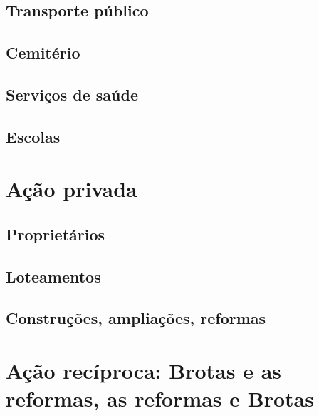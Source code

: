 \documentclass[
	12pt,					%
	openright,			%
	twoside,			%
	a4paper,			%
	english,				%
	french,				%
	spanish,			%
	brazil				%
	]{abntex2}
\begin{document}
\lipsum[50]

\subsection{Transporte público}\label{subsec:3.1.4}

\lipsum[50]

\subsection{Cemitério}\label{subsec:3.1.5}

\lipsum[50]

\subsection{Serviços de saúde}\label{subsec:3.1.6}

\lipsum[50]

\subsection{Escolas}\label{subsec:3.1.7}

\lipsum[50]

\section{Ação privada}\label{sec:3.2}

\lipsum[50]

\subsection{Proprietários}\label{subsec:3.2.1}

\lipsum[50]

\subsection{Loteamentos}\label{subsec:3.2.2}

\lipsum[50]

\subsection{Construções, ampliações, reformas}\label{subsec:3.2.3}

\lipsum[50]
\cite{CARNEIRO1954}

\section{Ação recíproca: Brotas e as reformas, as reformas e Brotas}\label{sec:3.3}
\end{document}
